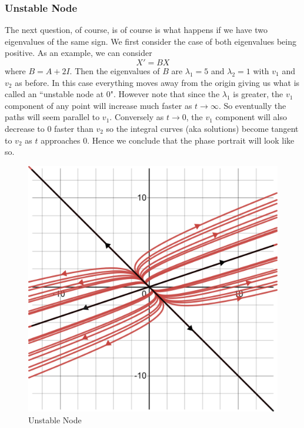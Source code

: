 \subsubsection{Unstable Node}
The next question, of course, is of course is what happens if we have two eigenvalues of the same sign. We first consider the case of both eigenvalues being positive. As an example, we can consider
\begin{equation}
    X' = BX
\end{equation}
where $B = A + 2I$. Then the eigenvalues of $B$ are $\lambda_1 = 5$ and $\lambda_2 = 1$ with $v_1$ and $v_2$ as before. In this case everything moves away from the origin giving us what is called an ``unstable node at 0". However note that since the $\lambda_1$ is greater, the $v_1$ component of any point will increase much faster as $t \to \infty$. So eventually the paths will seem parallel to $v_1$. Conversely as $t \to 0$, the $v_1$ component will also decrease to 0 faster than $v_2$ so the integral curves (aka solutions) become tangent to $v_2$ as $t$ approaches 0. Hence we conclude that the phase portrait will look like so.

\begin{figure}[h]
    \centering
    \includegraphics[scale=0.35]{Images/unstable_node.png}
    \caption{Unstable Node}
    \label{fig:unstable_node}
\end{figure}

